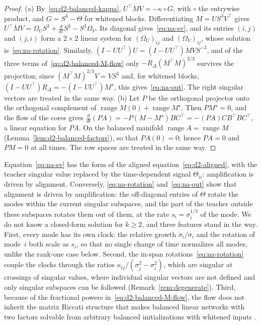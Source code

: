 \documentclass[11pt]{article}
\theoremstyle{definition}
\numberwithin{equation}{section}
\begin{document}
\begin{proof}
(a) By~\eqref{eq:d2-balanced-kappa}, $U^\top\dot MV=-\kappa\circ G$, with $\circ$ the entrywise product, and $G=S^3-\Theta$ for whitened blocks. Differentiating $M=US^3V^\top$ gives $U^\top\dot MV=\Omega_US^3+\tfrac{d}{dt}S^3-S^3\Omega_V$. Its diagonal gives~\eqref{eq:na-sv}, and its entries $(i,j)$ and $(j,i)$ form a $2\times2$ linear system for $(\Omega_U)_{ij}$ and $(\Omega_V)_{ij}$, whose solution is~\eqref{eq:na-rotation}. Similarly, $(I-UU^\top)\dot U=(I-UU^\top)\dot MVS^{-3}$, and of the three terms of~\eqref{eq:d2-balanced-M-flow} only $-R_\Delta(M^\top M)^{2/3}$ survives the projection; since $(M^\top M)^{2/3}V=VS^4$ and, for whitened blocks, $(I-UU^\top)R_\Delta=-(I-UU^\top)M^\star$, this gives~\eqref{eq:na-out}. The right singular vectors are treated in the same way. (b) Let $P$ be the orthogonal projector onto the orthogonal complement of $\operatorname{range}M(0)+\operatorname{range}M^\star$. Then $PM^\star=0$, and the flow of the cores gives $\tfrac{d}{dt}(PA)=-P(M-M^\star)BC^\top=-(PA)CB^\top BC^\top$, a linear equation for $PA$. On the balanced manifold $\operatorname{range}A=\operatorname{range}M$ (Lemma~\ref{lem:d2-balanced-factors}), so that $PA(0)=0$; hence $PA=0$ and $PM=0$ at all times. The row spaces are treated in the same way.
\end{proof}

Equation~\eqref{eq:na-sv} has the form of the aligned equation~\eqref{eq:d2-aligned}, with the teacher singular value replaced by the time-dependent signal $\Theta_{ii}$: amplification is driven by alignment. Conversely, \eqref{eq:na-rotation} and~\eqref{eq:na-out} show that alignment is driven by amplification: the off-diagonal entries of $\Theta$ rotate the modes within the current singular subspaces, and the part of the teacher outside these subspaces rotates them out of them, at the rate $s_i=\sigma_i^{1/3}$ of the mode. We do not know a closed-form solution for $k\ge2$, and three features stand in the way. First, every mode has its own clock: the relative growth $\dot\sigma_i/\sigma_i$ and the rotation of mode~$i$ both scale as $s_i$, so that no single change of time normalizes all modes, unlike the rank-one case below. Second, the in-span rotations~\eqref{eq:na-rotation} couple the clocks through the ratios $\kappa_{ij}/(\sigma_j^2-\sigma_i^2)$, which are singular at crossings of singular values, where individual singular vectors are not defined and only singular subspaces can be followed (Remark~\ref{rem:degenerate}). Third, because of the fractional powers in~\eqref{eq:d2-balanced-M-flow}, the flow does not inherit the matrix Riccati structure that makes balanced linear networks with two factors solvable from arbitrary balanced initializations with whitened inputs \citep{braun2022exact}.
\end{document}
